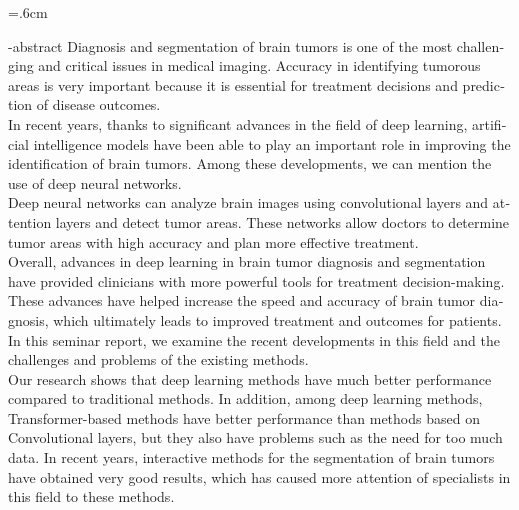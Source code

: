 
\baselineskip=.6cm
\begin{latin}
\en-abstract{
Diagnosis and segmentation of brain tumors is one of the most challenging and critical issues in medical imaging. Accuracy in identifying tumorous areas is very important because it is essential for treatment decisions and prediction of disease outcomes.
\\
In recent years, thanks to significant advances in the field of deep learning, artificial intelligence models have been able to play an important role in improving the identification of brain tumors. Among these developments, we can mention the use of deep neural networks.
\\
Deep neural networks can analyze brain images using convolutional layers and attention layers and detect tumor areas. These networks allow doctors to determine tumor areas with high accuracy and plan more effective treatment.
\\
Overall, advances in deep learning in brain tumor diagnosis and segmentation have provided clinicians with more powerful tools for treatment decision-making. These advances have helped increase the speed and accuracy of brain tumor diagnosis, which ultimately leads to improved treatment and outcomes for patients. In this seminar report, we examine the recent developments in this field and the challenges and problems of the existing methods.
\\
Our research shows that deep learning methods have much better performance compared to traditional methods. In addition, among deep learning methods, Transformer-based methods have better performance than methods based on Convolutional layers, but they also have problems such as the need for too much data. In recent years, interactive methods for the segmentation of brain tumors have obtained very good results, which has caused more attention of specialists in this field to these methods.
}
\latinfirstPage
\end{latin}
